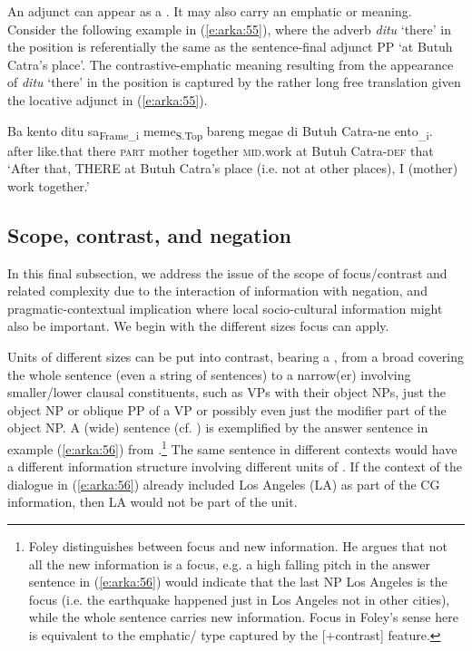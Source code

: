 \documentclass[output=paper
,modfonts
,nonflat]{langsci/langscibook}
\begin{document}
\noindent
An adjunct can appear as a . It may also carry an emphatic or  meaning. Consider the following example in (\ref{e:arka:55}), where the adverb \textit{ditu} ‘there’ in the  position is referentially the same as the sentence-final adjunct PP ‘at Butuh Catra’s place’. The contrastive-emphatic meaning resulting from the appearance of \textit{ditu} ‘there’ in the  position is captured by the rather long free translation given the locative adjunct in (\ref{e:arka:55}). 

\begin{exe}
	\ex\label{e:arka:55}
	\gll Ba kento   {\ob}ditu   sa{\cb}\textsubscript{Frame\_i}   {\ob}meme{\cb}\textsubscript{S.Top}   bareng   megae {\ob}di   Butuh Catra-ne   ento{\cb}\textsubscript{\_i}.\\
	after like.that  \phantom{[}there   \textsc{part}  \phantom{[}mother  together  \textsc{mid}.work \phantom{[}at  Butuh Catra-\textsc{def}  that\\
	\glt ‘After that, THERE at Butuh Catra’s place (i.e. not at other places), I (mother) work together.’
\end{exe}

\subsection{\label{s6.3}Scope, contrast, and negation}

In this final subsection, we address the issue of the scope of focus/contrast and related complexity due to the interaction of information with negation,  and pragmatic-contextual implication where local socio-cultural information might also be important. We begin with the different sizes focus can apply.  

Units of different sizes can be put into contrast, bearing a , from a broad  covering the whole sentence (even a string of sentences) to a narrow(er)  involving smaller/lower clausal constituents, such as VPs with their object NPs, just the object NP or oblique PP of a VP or possibly even just the modifier part of the object NP. A (wide) sentence  (cf. \citealt{Lambrecht1994}) is exemplified by the answer sentence in example (\ref{e:arka:56}) from  \citep{Foley1994}.\footnote{Foley distinguishes between focus and new information. He argues that not all the new information is a focus, e.g. a high falling pitch in the answer sentence in (\ref{e:arka:56}) would indicate that the last NP Los Angeles is the focus (i.e. the earthquake happened just in Los Angeles not in other cities), while the whole sentence carries new information. Focus in Foley’s sense here is equivalent to the emphatic/ type captured by the [+contrast] feature.}  The same sentence in different  contexts would have a different information structure involving different units of . If the context of the dialogue in (\ref{e:arka:56}) already included Los Angeles (LA) as part of the CG information, then LA would not be part of the  unit.
\end{document}
